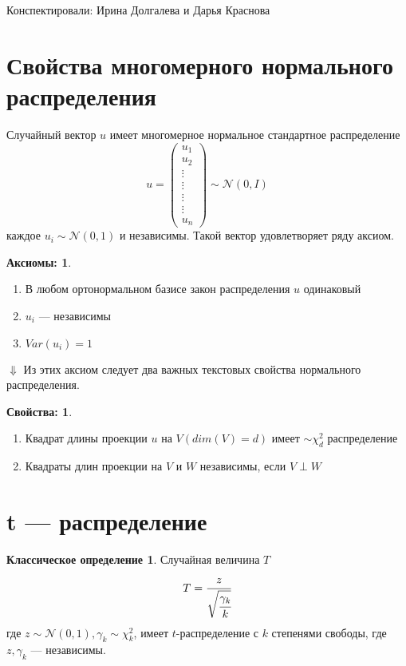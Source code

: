 \documentclass[12pt]{article} %
\theoremstyle{definition} %
\def \cN{\mathcal{N}}
\begin{document}
Конспектировали: Ирина Долгалева и Дарья Краснова

\section{Свойства многомерного нормального распределения}
    Случайный вектор $u$ имеет многомерное нормальное стандартное распределение 
    \[
        u = \begin{pmatrix} u_1 \\ u_2 \\ \vdots \\ \vdots \\ \vdots \\ \vdots \\ u_n \end{pmatrix} \sim \mathcal{N}(0, I)
    \]
    каждое $u_i \sim\cN(0, 1)$ и независимы.
Такой вектор удовлетворяет ряду аксиом.
\newtheorem*{axiom}{Аксиомы:}
\begin{axiom}
    \begin{enumerate}
        \item В любом ортонормальном базисе закон распределения $u$ одинаковый
        \item $u_i$  — независимы
        \item $Var(u_i) = 1$
    \end{enumerate} 
\end{axiom}    
\par
$\Downarrow$ Из этих аксиом следует два важных текстовых свойства нормального распределения.    

\newtheorem*{prop}{Свойства:}
\begin{prop}    
    \begin{enumerate}    
        \item Квадрат длины проекции $u$ на $V (dim(V) = d)$ имеет $\sim\mathcal{\chi}_{d}^2$ распределение
        \item Квадраты длин проекции на $V$ и $W$ независимы, если  $V \perp W$
    \end{enumerate}
\end{prop}
 


\section{t — распределение}
\newtheorem*{classic_def}{Классическое определение}
\begin{classic_def}\hspace{2cm} \par
\smallskip
    Случайная величина $T$
    \[
        T = \cfrac{z}{\sqrt{\cfrac{\gamma_k}{k}}}
    \]
    где $z \sim \cN(0,1), \gamma_k \sim \mathcal{\chi}_k^2$,
    имеет $t$-распределение с $k$ степенями свободы, где $z, \gamma_k$  — независимы.
\end{classic_def}
\end{document}
